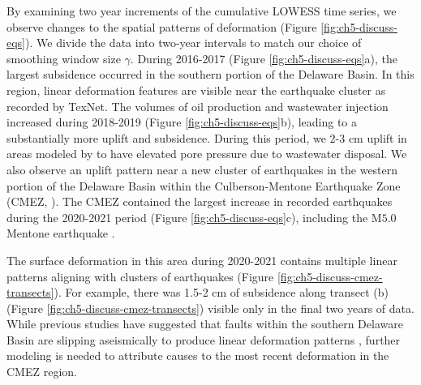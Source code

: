 \FloatBarrier




By examining two year increments of the cumulative LOWESS time series, we observe changes to the spatial patterns of deformation (Figure \ref{fig:ch5-discuss-eqs}).
We divide the data into two-year intervals to match our choice of smoothing window size $ \gamma $.
During 2016-2017 (Figure \ref{fig:ch5-discuss-eqs}a), the largest subsidence occurred in the southern portion of the Delaware Basin. In this region, linear deformation features are visible near the earthquake cluster as recorded by TexNet.
The volumes of oil production and wastewater injection increased during 2018-2019 (Figure \ref{fig:ch5-discuss-eqs}b), leading to a substantially more uplift and subsidence. 
During this period, we 2-3 cm uplift in areas modeled by \cite{Ge2022RecentWaterDisposal} to have elevated pore pressure due to wastewater disposal.
We also observe an uplift pattern near a new cluster of earthquakes in the western portion of the Delaware Basin within the Culberson-Mentone Earthquake Zone (CMEZ, \cite{Hennings2021StabilityFaultSystems}).
The CMEZ contained the largest increase in recorded earthquakes during the 2020-2021 period (Figure \ref{fig:ch5-discuss-eqs}c), including the M$ 5.0 $ Mentone earthquake \citep{Skoumal2020InducedMw5.0}. 

The surface deformation in this area during 2020-2021 contains multiple linear patterns aligning with clusters of earthquakes (Figure \ref{fig:ch5-discuss-cmez-transects}). For example, there was 1.5-2 cm of subsidence along transect (b) (Figure \ref{fig:ch5-discuss-cmez-transects}) visible only in the final two years of data. 
While previous studies have suggested that faults within the southern Delaware Basin are slipping aseismically to produce linear deformation patterns \citep{Pepin2022ShallowAseismicSlip}, further modeling is needed to attribute causes to the most recent deformation in the CMEZ region.

